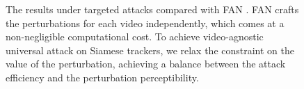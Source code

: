 \documentclass[12pt]{article}
\begin{document}
\begin{figure}[h]
    \centering
    \caption{The results under targeted attacks compared with FAN \cite{FAN}.  FAN crafts the perturbations for each video independently, which comes at a non-negligible computational cost. To achieve video-agnostic universal attack on Siamese trackers, we relax the constraint on the value of the perturbation, achieving a balance between the attack efficiency and the perturbation perceptibility.}
    \label{fig:vis}
\end{figure}
\end{document}
